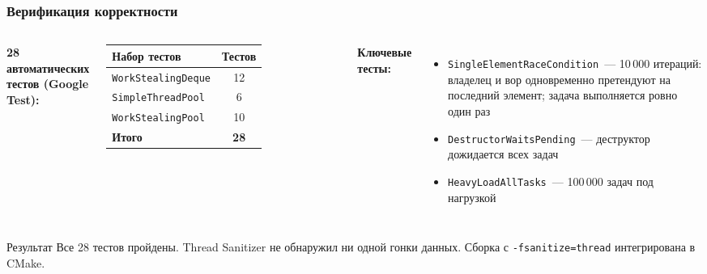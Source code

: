 \documentclass[pdf, hyperref={unicode}, aspectratio=169]{beamer}
\begin{document}
\begin{frame}
\frametitle{Верификация корректности}

\begin{columns}[T]

\textbf{28 автоматических тестов (Google Test):}

\medskip
\begin{tabular}{lc}
\toprule
Набор тестов & Тестов \\
\midrule
\texttt{WorkStealingDeque} & 12 \\
\texttt{SimpleThreadPool}  & 6  \\
\texttt{WorkStealingPool}  & 10 \\
\midrule
\textbf{Итого} & \textbf{28} \\
\bottomrule
\end{tabular}

\textbf{Ключевые тесты:}
\begin{itemize}
  \item \texttt{SingleElementRaceCondition}~---
        10\,000 итераций: владелец и вор
        одновременно претендуют на
        последний элемент; задача
        выполняется ровно один раз
  \item \texttt{DestructorWaitsPending}~---
        деструктор дожидается всех задач
  \item \texttt{HeavyLoadAllTasks}~---
        100\,000 задач под нагрузкой
\end{itemize}
\end{columns}

\medskip
\begin{block}{Результат}
  Все 28 тестов пройдены.
  Thread Sanitizer не обнаружил ни одной гонки данных.
  Сборка с \texttt{-fsanitize=thread} интегрирована в CMake.
\end{block}
\end{frame}
\end{document}
